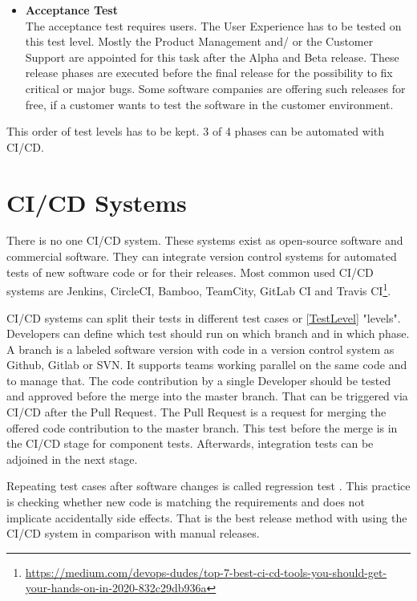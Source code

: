 \begin{itemize}
\item \textbf{Acceptance Test} \\
The acceptance test requires users. The User Experience has to be tested on this test level. Mostly the Product Management and/ or the Customer Support are appointed for this task after the Alpha and Beta release. These release phases are executed before the final release for the possibility to fix critical or major bugs.
Some software companies are offering such releases for free, if a customer wants to test the software in the customer environment.
\end{itemize}
This order of test levels has to be kept. 3 of 4 phases can be automated with \gls{CI/CD}. 

\section{\gls{CI/CD} Systems} \label{CI-CD}

There is no one \gls{CI/CD} system. These systems exist as open-source software and commercial software. They can integrate version control systems for automated tests of new software code or for their releases. Most common used \gls{CI/CD} systems are Jenkins, CircleCI, Bamboo, TeamCity, GitLab CI and Travis CI\footnote{\url{https://medium.com/devops-dudes/top-7-best-ci-cd-tools-you-should-get-your-hands-on-in-2020-832c29db936a}}.

\gls{CI/CD} systems can split their tests in different test cases or \ref{TestLevel} "levels". Developers can define which test should run on which branch and in which phase. A branch is a labeled software version with code in a version control system as Github, Gitlab or SVN. It supports teams working parallel on the same code and to manage that. The code contribution by a single Developer should be tested and approved before the merge into the master branch. That can be triggered via \gls{CI/CD} after the Pull Request. The Pull Request is a request for merging the offered code contribution to the master branch. This test before the merge is in the \gls{CI/CD} stage for component tests. Afterwards, integration tests can be adjoined in the next stage.

Repeating test cases after software changes is called regression test \cite[~p.98]{Spillner2019}. This practice is checking whether new code is matching the requirements and does not implicate accidentally side effects. That is the best release method with using the \gls{CI/CD} system in comparison with manual releases.

